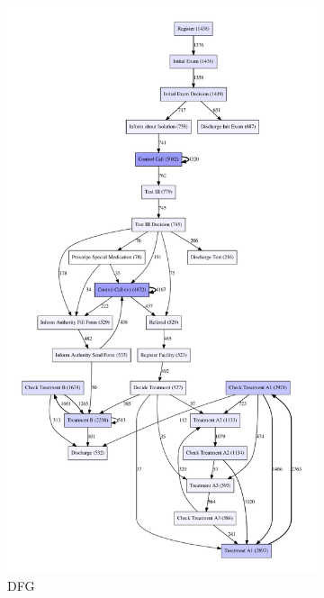 \documentclass[12pt]{report}
\begin{document}
\begin{figure}[h]
    \centering
    \begin{subfigure}[b]{0.2\textwidth}
        \centering
	\includegraphics[width=\textwidth]{figures/q1_d_dfg_noise_threshold_tuning.pdf}
        \caption{DFG}
        \label{fig:figures-q1_d_dfg_noise_threshold_tuning-pdf}
    \end{subfigure}
    \hfill
    \begin{subfigure}[b]{0.7\textwidth}

\end{subfigure}
\end{figure}
\end{document}
